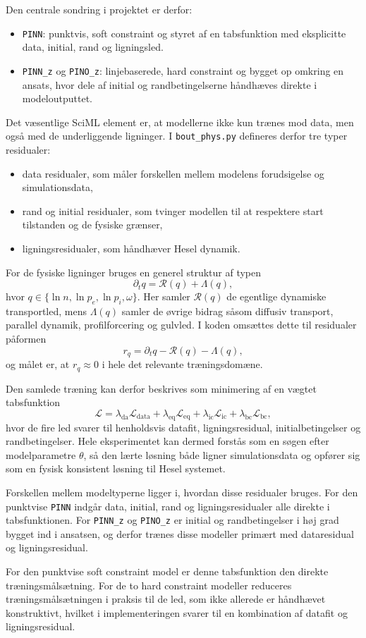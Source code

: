 Den centrale sondring i projektet er derfor:
\begin{itemize}
    \item \texttt{PINN}: punktvis, soft constraint og styret af en tabsfunktion med eksplicitte data, initial, rand og ligningsled.
    \item \texttt{PINN\_z} og \texttt{PINO\_z}: linjebaserede, hard constraint og bygget op omkring en ansats, hvor dele af initial og randbetingelserne håndhæves direkte i modeloutputtet.
\end{itemize}

Det væsentlige SciML element er, at modellerne ikke kun trænes mod data, men også med de underliggende ligninger. I \texttt{bout\_phys.py} defineres derfor tre typer residualer:
\begin{itemize}
    \item data residualer, som måler forskellen mellem modelens forudsigelse og simulationsdata,
    \item rand og initial residualer, som tvinger modellen til at respektere start tilstanden og de fysiske grænser,
    \item ligningsresidualer, som håndhæver Hesel dynamik.
\end{itemize}

For de fysiske ligninger bruges en generel struktur af typen
\[
\partial_t q = \mathcal{R}(q) + \Lambda(q),
\]
hvor \(q\in\{\ln n,\ln p_e,\ln p_i,\omega\}\). Her samler \(\mathcal{R}(q)\) de egentlige dynamiske transportled, mens \(\Lambda(q)\) samler de øvrige bidrag såsom diffusiv transport, parallel dynamik, profilforcering og gulvled. I koden omsættes dette til residualer påformen
\[
r_q = \partial_t q - \mathcal{R}(q) - \Lambda(q),
\]
og målet er, at \(r_q\approx 0\) i hele det relevante træningsdomæne.

Den samlede træning kan derfor beskrives som minimering af en vægtet tabsfunktion
\[
\mathcal{L}
=
\lambda_{\mathrm{da}}\mathcal{L}_{\mathrm{data}}
+ \lambda_{\mathrm{eq}}\mathcal{L}_{\mathrm{eq}}
+ \lambda_{\mathrm{ic}}\mathcal{L}_{\mathrm{ic}}
+ \lambda_{\mathrm{bc}}\mathcal{L}_{\mathrm{bc}},
\]
hvor de fire led svarer til henholdsvis datafit, ligningsresidual, initialbetingelser og randbetingelser. Hele eksperimentet kan dermed forstås som en søgen efter modelparametre \(\theta\), så den lærte løsning både ligner simulationsdata og opfører sig som en fysisk konsistent løsning til Hesel systemet.

Forskellen mellem modeltyperne ligger i, hvordan disse residualer bruges. For den punktvise \texttt{PINN} indgår data, initial, rand og ligningsresidualer alle direkte i tabsfunktionen. For \texttt{PINN\_z} og \texttt{PINO\_z} er initial og randbetingelser i høj grad bygget ind i ansatsen, og derfor trænes disse modeller primært med dataresidual og ligningsresidual.

For den punktvise soft constraint model er denne tabsfunktion den direkte træningsmålsætning. For de to hard constraint modeller reduceres træningsmålsætningen i praksis til de led, som ikke allerede er håndhævet konstruktivt, hvilket i implementeringen svarer til en kombination af datafit og ligningsresidual.
